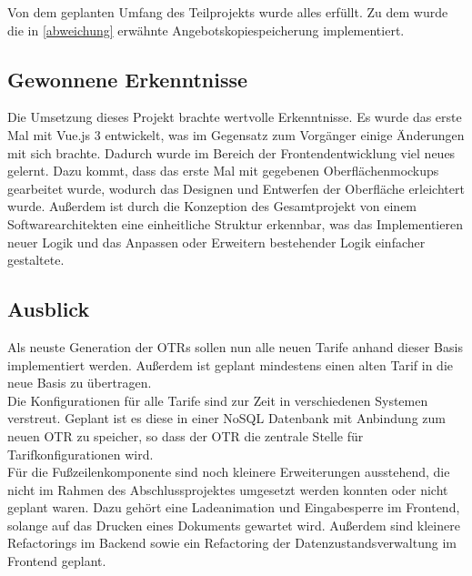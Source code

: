  Von dem geplanten Umfang des Teilprojekts wurde alles erfüllt. Zu dem wurde die in \ref{abweichung} erwähnte Angebotskopiespeicherung implementiert.
\subsection{Gewonnene Erkenntnisse}
\label{erkenntnisse}
Die Umsetzung dieses Projekt brachte wertvolle Erkenntnisse. Es wurde das erste Mal mit Vue.js 3 entwickelt, was im Gegensatz zum Vorgänger einige Änderungen mit sich brachte. Dadurch wurde im Bereich der Frontendentwicklung viel neues gelernt. Dazu kommt, dass das erste Mal mit gegebenen Oberflächenmockups gearbeitet wurde, wodurch das Designen und Entwerfen der Oberfläche erleichtert wurde. Außerdem ist durch die Konzeption des Gesamtprojekt von einem Softwarearchitekten eine einheitliche Struktur erkennbar, was das Implementieren neuer Logik und das Anpassen oder Erweitern bestehender Logik einfacher gestaltete.
\subsection{Ausblick}
\label{ausblick}
Als neuste Generation der \ac{OTR}s sollen nun alle neuen Tarife anhand dieser Basis implementiert werden. Außerdem ist geplant mindestens einen alten Tarif in die neue Basis zu übertragen.\\
Die Konfigurationen für alle Tarife sind zur Zeit in verschiedenen Systemen verstreut. Geplant ist es diese in einer NoSQL Datenbank mit Anbindung zum neuen \ac{OTR} zu speicher, so dass der \ac{OTR} die zentrale Stelle für Tarifkonfigurationen wird.\\
Für die Fußzeilenkomponente sind noch kleinere Erweiterungen ausstehend, die nicht im Rahmen des Abschlussprojektes umgesetzt werden konnten oder nicht geplant waren. Dazu gehört eine Ladeanimation und Eingabesperre im Frontend, solange auf das Drucken eines Dokuments gewartet wird. Außerdem sind kleinere Refactorings im Backend sowie ein Refactoring der Datenzustandsverwaltung im Frontend geplant.